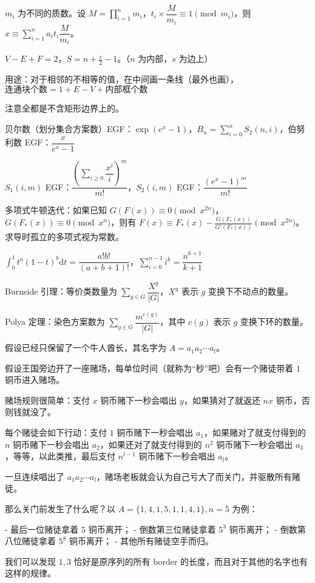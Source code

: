 \documentclass[12pt]{ctexart}
\begin{document}
$m_i$ 为不同的质数。设 $M=\prod\limits_{i=1}^nm_i$，$t_i\times \dfrac {M}{m_i}\equiv 1\pmod {m_i}$，则 $x\equiv \sum\limits_{i=1}^na_it_i\dfrac {M}{m_i}$。

$V-E+F=2$，$S=n+\frac s2-1$。（$n$ 为内部，$s$ 为边上）

用途：对于相邻的不相等的值，在中间画一条线（最外也画），$\text{连通块个数}=1+E-V+\text{内部框个数}$

注意全都是不含矩形边界上的。

贝尔数（划分集合方案数）EGF：$\exp(e^x-1)$，$B_n=\sum\limits_{i=0}^n S_2(n,i)$，伯努利数 EGF：$\dfrac{x}{e^x-1}$

$S_1(i,m)$ EGF：$\dfrac{(\sum\limits_{i\ge 0}\dfrac{x^i}i)^m}{m!}$，$S_2(i,m)$ EGF：$\dfrac{(e^x-1)^m}{m!}$

多项式牛顿迭代：如果已知 $G(F(x))\equiv0\pmod{x^{2n}}$，$G(F_*(x))\equiv0\pmod {x^n}$，则有 $F(x)\equiv F_*(x)-\frac{G(F_*(x))}{G'(F_*(x))}\pmod{x^{2n}}$。求导时孤立的多项式视为常数。

$\int_0^1 t^a(1-t)^b\mathrm{d}t=\dfrac{a!b!}{(a+b+1)!}$，$\sum\limits_{i=0}^{n-1}i^{\underline{k}}=\dfrac{n^{\underline{k+1}}}{k+1}$

Burnside 引理：等价类数量为 $\sum\limits_{g\in G}\dfrac{X^g}{|G|}$，$X^g$ 表示 $g$ 变换下不动点的数量。

Polya 定理：染色方案数为 $\sum\limits_{g\in G}\dfrac{m^{c(g)}}{|G|}$，其中 $c(g)$ 表示 $g$ 变换下环的数量。

假设已经只保留了一个牛人酋长，其名字为 $A=a_1a_2\cdots a_l$。

假设王国旁边开了一座赌场，每单位时间（就称为“秒”吧）会有一个赌徒带着 $1$ 铜币进入赌场。

赌场规则很简单：支付 $x$ 铜币赌下一秒会唱出 $y$，如果猜对了就返还 $nx$ 铜币，否则钱就没了。

每个赌徒会如下行动：支付 $1$ 铜币赌下一秒会唱出 $a_1$，如果赌对了就支付得到的 $n$ 铜币赌下一秒会唱出 $a_2$，如果还对了就支付得到的 $n^2$ 铜币赌下一秒会唱出 $a_3$，等等，以此类推，最后支付 $n^{l-1}$ 铜币赌下一秒会唱出 $a_l$。

一旦连续唱出了 $a_1a_2\cdots a_l$，赌场老板就会认为自己亏大了而关门，并驱散所有赌徒。

那么关门前发生了什么呢？以 $A=\{1,4,1,5,1,1,4,1\},n=5$ 为例：

- 最后一位赌徒拿着 $5$ 铜币离开；
- 倒数第三位赌徒拿着 $5^3$ 铜币离开；
- 倒数第八位赌徒拿着 $5^8$ 铜币离开；
- 其他所有赌徒空手而归。

我们可以发现 $1,3$ 恰好是原序列的所有 border 的长度，而且对于其他的名字也有这样的规律。
\end{document}
